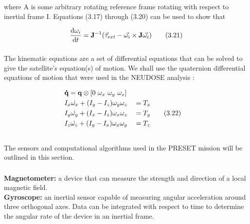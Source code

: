 \documentclass{article}
\begin{document}
\noindent where A is some arbitrary rotating reference frame rotating with respect to inertial frame I. Equations (3.17) through (3.20) can be used to show that 

\begin{align}
        \frac{\textup{d} \omega_{i}}{\textup{d} t} = \mathbf{J}^{-1}(\vec{\tau}_{ext} - \vec{\omega_{i}} \times \mathbf{J} \Vec{\omega_{i}}) \tag{3.21}
\end{align}

\subsubsection{\color{black}{Kinematic Equations}}

The kinematic equations are a set of differential equations that can be solved to give the satellite's equation(s) of motion. We shall use the quaternion differential equations of motion that were used in the NEUDOSE analysis \cite{neudose}:

\begin{alignat}{2}
	&\mathbf{\dot{q}} = \mathbf{q} \otimes [0 \,\, \omega_{x} \,\, \omega_{y} \,\, \omega_{z}] \notag \\
	&I_{x} \dot{\omega_{x}} + (I_{y} - I_{z}) \omega_{y} \omega_{z} &&= T_{x} \notag \\
	&I_{y} \dot{\omega_{y}} + (I_{x} - I_{z}) \omega_{x} \omega_{z} &&= T_{y} \tag{3.22} \\
	&I_{z} \dot{\omega_{z}} + (I_{y} - I_{x}) \omega_{x} \omega_{y} &&= T_{z} \notag \notag
\end{alignat}

\subsection{\color{black}{Attitude Determination}}

The sensors and computational algorithms used in the PRESET mission will be outlined in this section.

\subsubsection{\color{black}{Sensors}}

\textbf{Magnetometer:} a device that can measure the strength and direction of a local magnetic field. \\
    
\noindent \textbf{Gyroscope:} an inertial sensor capable of measuring angular acceleration around three orthogonal axes. Data can be integrated with respect to time to determine the angular rate of the device in an inertial frame.
\end{document}
